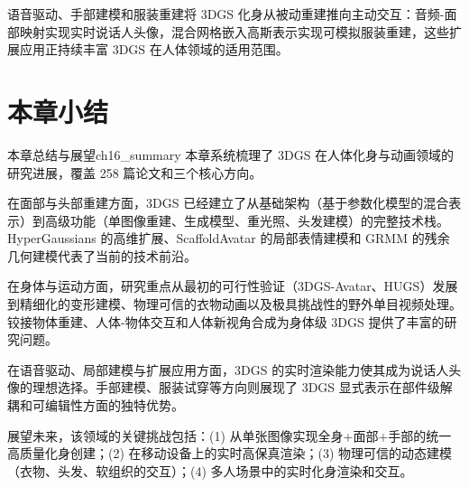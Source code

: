\begin{takeaway}
语音驱动、手部建模和服装重建将 3DGS 化身从被动重建推向主动交互：音频-面部映射实现实时说话人头像，混合网格嵌入高斯表示实现可模拟服装重建，这些扩展应用正持续丰富 3DGS 在人体领域的适用范围。
\end{takeaway}




\section*{本章小结}

\begin{futurebox}{本章总结与展望}{ch16_summary}
本章系统梳理了 3DGS 在人体化身与动画领域的研究进展，覆盖 258 篇论文和三个核心方向。

在面部与头部重建方面，3DGS 已经建立了从基础架构（基于参数化模型的混合表示）到高级功能（单图像重建、生成模型、重光照、头发建模）的完整技术栈。HyperGaussians 的高维扩展、ScaffoldAvatar 的局部表情建模和 GRMM 的残余几何建模代表了当前的技术前沿。

在身体与运动方面，研究重点从最初的可行性验证（3DGS-Avatar、HUGS）发展到精细化的变形建模、物理可信的衣物动画以及极具挑战性的野外单目视频处理。铰接物体重建、人体-物体交互和人体新视角合成为身体级 3DGS 提供了丰富的研究问题。

在语音驱动、局部建模与扩展应用方面，3DGS 的实时渲染能力使其成为说话人头像的理想选择。手部建模、服装试穿等方向则展现了 3DGS 显式表示在部件级解耦和可编辑性方面的独特优势。

展望未来，该领域的关键挑战包括：(1) 从单张图像实现全身+面部+手部的统一高质量化身创建；(2) 在移动设备上的实时高保真渲染；(3) 物理可信的动态建模（衣物、头发、软组织的交互）；(4) 多人场景中的实时化身渲染和交互。
\end{futurebox}

